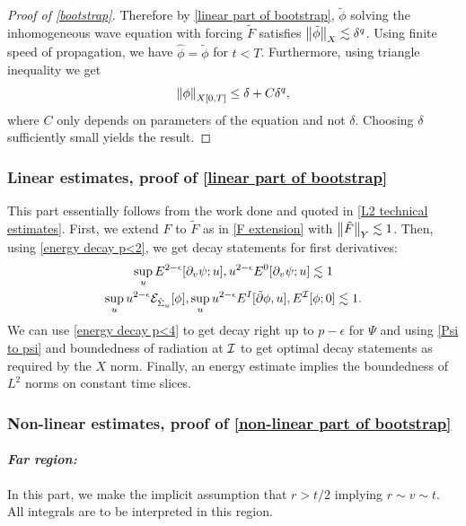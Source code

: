 \documentclass[11pt, oneside]{amsart}
\begin{document}
\begin{proof}[Proof of \cref{bootstrap}]
		Therefore by \cref{linear part of bootstrap}, $\tilde{\phi}$ solving the inhomogeneous wave equation with forcing $\tilde{F}$ satisfies $\left\lVert \tilde{\phi}\right\rVert_{X}\lesssim \delta^q$. Using finite speed of propagation, we have $\hat{\phi}=\tilde{\phi}$ for $t<T$. Furthermore, using triangle inequality we get 
		\begin{equation*}
			\begin{gathered}
				\left\lVert \phi\right\rVert_{X[0,T]}\leq \delta+C \delta^q,
			\end{gathered}
		\end{equation*}
		where $C$ only depends on parameters of the equation and not $\delta$. Choosing $\delta$ sufficiently small yields the result.
	\end{proof}
	\subsubsection{Linear estimates, proof of \cref{linear part of bootstrap}}
	This part essentially follows from the work done and quoted in \cref{L2 technical estimates}. First, we extend $F$ to $\tilde{F}$ as in \eqref{F extension} with $\left\lVert \tilde{F}\right\rVert_Y\lesssim1$. Then, using \cref{energy decay p<2}, we get decay statements for first derivatives: 
	\begin{equation*}
		\begin{gathered}
			\sup_uE^{2-\epsilon}[\partial_v\psi;u],u^{2-\epsilon}E^0[\partial_v\psi;u]\lesssim1\\
			\sup_uu^{2-\epsilon}\mathcal{E}_{\hat{\Sigma}_u}[\phi],	\sup_uu^{2-\epsilon}E^{I}[\tilde{\partial}\phi,u],E^{\mathcal{I}}[\phi;0]\lesssim1.
		\end{gathered}
	\end{equation*}
	We can use \cref{energy decay p<4} to get decay right up to $p-\epsilon$ for $\Psi$ and using \cref{Psi to psi} and boundedness of radiation at $\mathcal{I}$ to get optimal decay statements as required by the $X$ norm. Finally, an energy estimate implies the boundedness of $L^2$ norms on constant time slices.
	\subsubsection{Non-linear estimates, proof of \cref{non-linear part of bootstrap}}

	
	\paragraph{\textit{Far region:}} In this part, we make the implicit assumption that $r>t/2$ implying $r\sim v\sim t$. All integrals are to be interpreted in this region.
	
\end{document}

